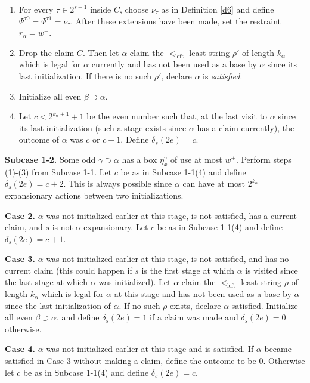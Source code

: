 \documentclass[10pt,a4paper]{amsart}
\begin{document}
\begin{enumerate}[label=(\arabic*)]
\item For every $\tau\in2^{s-1}$ inside $C$, choose $\nu_\tau$ as in Definition \ref{d6} and
      define $\Psi^{\tau0}=\Psi^{\tau1}=\nu_\tau$.  After these extensions have
      been made, set the restraint $r_\alpha=w^+ $.
  
\item Drop the claim $C$.  Then let $\alpha$ claim the
      $<_{\mathrm{left}}$-least string $\rho'$ of length $k_\alpha$ which is
      legal for $\alpha$ currently and has not been used as a base
      by $\alpha$ since its last initialization. If there is no
      such $\rho'$, declare $\alpha$ is \emph{satisfied}.
\item Initialize all even $\beta\supset\alpha$.
\item Let $c<2^{k_\alpha+1}+1$ be the even number such that, at the last visit to $\alpha$ since its last initialization (such a stage exists since $\alpha$ has a claim currently), the outcome of
      $\alpha$ was $c$ or $c+1$.  Define $\delta_s(2e)=c$.
\end{enumerate}

\textbf{Subcase 1-2.}  Some odd $\gamma\supset\alpha$ has a box
$\eta_x^\gamma$ of use at most $w^+$.  Perform steps (1)-(3) from Subcase 1-1.
Let $c$ be as in Subcase 1-1(4) and define $\delta_s(2e)=c+2$.  This
is always possible since $\alpha$ can have at most $2^{k_\alpha}$ expansionary
actions between two initializations.

\textbf{Case 2.}  $\alpha$ was not initialized earlier at this stage, is not
satisfied, has a current claim, and $s$ is not $\alpha$-expansionary.  Let $c$ be as in Subcase 1-1(4) and define $\delta_s(2e)=c+1$.

\textbf{Case 3.}  $\alpha$ was not initialized earlier at this stage, is not
satisfied, and has no current claim (this could happen if $s$ is
the first stage at which $\alpha$ is visited since the last stage at which
$\alpha$ was initialized).  Let $\alpha$ claim the
$<_{\mathrm{left}}$-least string $\rho$ of length $k_\alpha$ which is legal for
$\alpha$ at this stage and has not been used as a base by $\alpha$ since the
last initialization of $\alpha$.  If no such $\rho$ exists, declare $\alpha$
satisfied.  Initialize all even $\beta\supset\alpha$, 
and define $\delta_s(2e)=1$ if a claim was made
and $\delta_s(2e)=0$ otherwise.

\textbf{Case 4.}  $\alpha$ was not initialized earlier at this stage and is
satisfied.  If $\alpha$ became satisfied in Case 3 without making a claim, define the outcome to be 0.
Otherwise let $c$ be as in Subcase 1-1(4) and define $\delta_s(2e)=c$.
\end{document}
